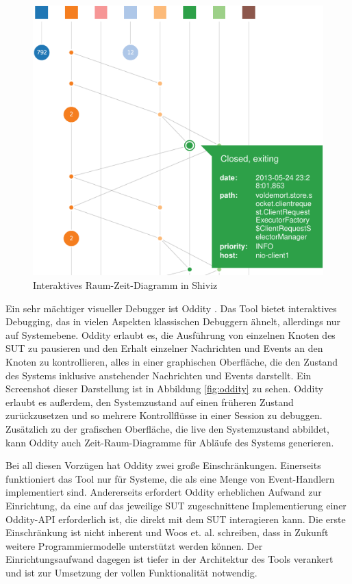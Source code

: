 \documentclass[12pt,a4paper]{report}
\begin{document}
\begin{figure}[H]
	\centering
	\includegraphics[width=\linewidth]{img/shiviz_time_space.pdf}
    \caption[Interaktives Raum-Zeit-Diagramm in Shiviz]{Interaktives Raum-Zeit-Diagramm in Shiviz \cite{ShiViz_visual_debugger}}
	\label{fig:shiviz}
\end{figure}

Ein sehr mächtiger visueller Debugger ist Oddity \cite{oddity_graphical_debugger}. Das Tool bietet interaktives Debugging, das in
vielen Aspekten klassischen Debuggern ähnelt, allerdings nur auf Systemebene. Oddity erlaubt es, die Ausführung von einzelnen Knoten
des SUT zu pausieren und den Erhalt einzelner Nachrichten und Events an den Knoten zu kontrollieren, alles in einer graphischen Oberfläche, die den
Zustand des Systems inklusive anstehender Nachrichten und Events darstellt. Ein Screenshot dieser Darstellung ist in Abbildung
\ref{fig:oddity} zu sehen. Oddity erlaubt es außerdem, den Systemzustand auf einen früheren Zustand zurückzusetzen und so mehrere
Kontrollflüsse in einer Session zu debuggen. Zusätzlich zu der grafischen Oberfläche, die live den Systemzustand abbildet, kann
Oddity auch Zeit-Raum-Diagramme für Abläufe des Systems generieren.

Bei all diesen Vorzügen hat Oddity zwei große Einschränkungen. Einerseits funktioniert das Tool nur für Systeme, die als
eine Menge von Event-Handlern implementiert sind. Andererseits erfordert Oddity erheblichen Aufwand zur Einrichtung, da eine
auf das jeweilige SUT zugeschnittene Implementierung einer Oddity-API erforderlich ist, die direkt mit dem SUT interagieren kann.
Die erste Einschränkung ist nicht inherent und Woos et. al. \cite{oddity_graphical_debugger} schreiben, dass in Zukunft weitere
Programmiermodelle unterstützt werden können. Der Einrichtungsaufwand dagegen ist tiefer in der Architektur des Tools verankert und
ist zur Umsetzung der vollen Funktionalität notwendig.
\end{document}
